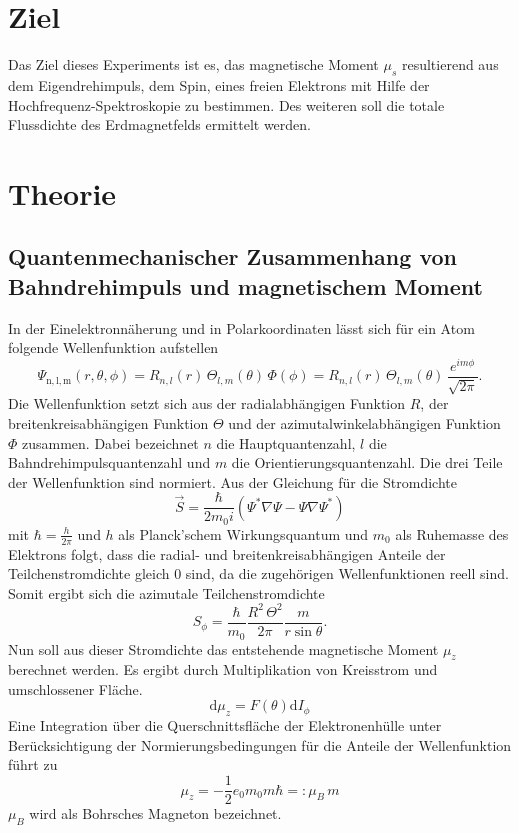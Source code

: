 \section{Ziel}
\label{sec:ziel}
Das Ziel dieses Experiments ist es, das magnetische Moment $\mu_s$ resultierend aus dem Eigendrehimpuls, dem Spin, eines freien Elektrons mit Hilfe der Hochfrequenz-Spektroskopie zu bestimmen. Des weiteren soll die totale Flussdichte des Erdmagnetfelds ermittelt werden.

\section{Theorie}
\label{sec:theorie}
\subsection{Quantenmechanischer Zusammenhang von Bahndrehimpuls und magnetischem Moment}
In der Einelektronnäherung und in Polarkoordinaten lässt sich für ein Atom folgende Wellenfunktion aufstellen
\begin{equation}
\Psi_\mathrm{n,l,m}(r,\theta,\phi) = R_{n,l}(r)\,\Theta_{l,m}(\theta)\,\Phi(\phi) = R_{n,l}(r)\,\Theta_{l,m}(\theta)\,\frac{e^{im\phi}}{\sqrt{2\pi}}.
\end{equation}
Die Wellenfunktion setzt sich aus der radialabhängigen Funktion $R$, der breitenkreisabhängigen Funktion $\Theta$ und der azimutalwinkelabhängigen Funktion $\Phi$ zusammen. Dabei bezeichnet $n$ die Hauptquantenzahl, $l$ die Bahndrehimpulsquantenzahl und $m$ die Orientierungsquantenzahl. Die drei Teile der Wellenfunktion sind normiert. Aus der Gleichung für die Stromdichte
\begin{equation}
  \vec{S}=\frac{\hbar}{2m_0i}(\Psi^* \nabla\Psi-\Psi\nabla\Psi^*)
\end{equation}
mit $\hbar=\frac{h}{2\pi}$ und $h$ als Planck'schem Wirkungsquantum und $m_0$ als Ruhemasse des Elektrons folgt, dass die radial- und breitenkreisabhängigen Anteile der Teilchenstromdichte gleich 0 sind, da die zugehörigen Wellenfunktionen reell sind. Somit ergibt sich die azimutale Teilchenstromdichte
\begin{equation}
  S_\phi = \frac{\hbar}{m_0}\frac{R^2\,\Theta^2}{2\pi}\frac{m}{r\sin\theta}.
\end{equation}
Nun soll aus dieser Stromdichte das entstehende magnetische Moment $\mu_z$ berechnet werden. Es ergibt durch Multiplikation von Kreisstrom und umschlossener Fläche.
\begin{equation}
  \mathrm{d}\mu_z=F(\theta)\mathrm{d}I_\phi
\end{equation}
Eine Integration über die Querschnittsfläche der Elektronenhülle unter Berücksichtigung der Normierungsbedingungen für die Anteile der Wellenfunktion führt zu
\begin{equation}
  \mu_z=-\frac{1}{2}{e_0}{m_0}m\hbar =:\mu_B\,m
\end{equation}
$\mu_B$ wird als Bohrsches Magneton bezeichnet.


